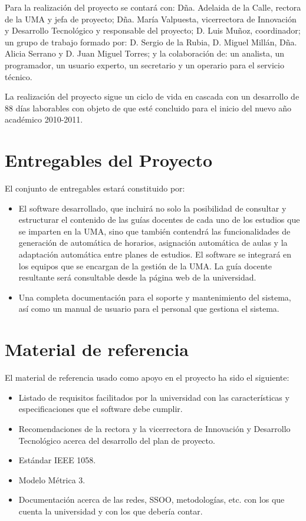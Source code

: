 \documentclass[11pt,a4paper,spanish,twoside]{report}
\begin{document}
Para la realización del proyecto se contará con: Dña. Adelaida de la Calle, 
rectora de la UMA y jefa de proyecto; Dña. María Valpuesta, vicerrectora de 
Innovación y Desarrollo Tecnológico y responsable del proyecto; D. Luis 
Muñoz, coordinador; un grupo de trabajo formado por: D. Sergio de la Rubia, 
D. Miguel Millán, Dña. Alicia Serrano y D. Juan Miguel Torres; y la 
colaboración de: un analista, un programador, un usuario experto, un 
secretario y un operario para el servicio técnico.

La realización del proyecto sigue un ciclo de vida en cascada con un 
desarrollo de 88 días laborables con objeto de que esté concluido para el 
inicio del nuevo año académico 2010-2011.

\section{Entregables del Proyecto}
El conjunto de entregables estará constituido por:
\begin{itemize}
\item El software desarrollado, que incluirá no solo la posibilidad de 
consultar y estructurar el contenido de las guías docentes de cada uno de los 
estudios que se imparten en la UMA, sino que también contendrá las 
funcionalidades de generación de automática de horarios, asignación automática 
de aulas y la adaptación automática entre planes de estudios. El software se 
integrará en los equipos que se encargan de la gestión de la UMA. La guía 
docente resultante será consultable desde la página web de la universidad.
\item Una completa documentación para el soporte y mantenimiento del sistema, 
así como un manual de usuario para el personal que gestiona el sistema.
\end{itemize}

\section{Material de referencia}
El material de referencia usado como apoyo en el proyecto ha sido el siguiente:
\begin{itemize}
\item Listado de requisitos facilitados por la universidad con las 
características y especificaciones que el software debe cumplir.
\item Recomendaciones de la rectora y la vicerrectora de Innovación y 
Desarrollo Tecnológico acerca del desarrollo del plan de proyecto.
\item Estándar IEEE 1058.
\item Modelo Métrica 3.
\item Documentación acerca de las redes, SSOO, metodologías, etc. con los que 
cuenta la universidad y con los que debería contar.
\end{itemize}
\end{document}
